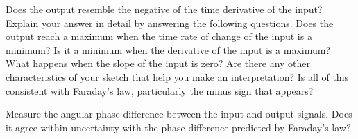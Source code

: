 Does the output resemble the negative of the time derivative of the input? 
Explain your answer in detail by answering the following questions.  Does the 
output reach a maximum when the time rate of change of the input is a minimum? 
Is it a minimum when the derivative of the input is a maximum?  What happens 
when the slope of the input is zero? Are there any other characteristics of 
your sketch that help you make an interpretation? Is all of this consistent 
with Faraday's law, particularly the minus sign that appears?

Measure the angular phase difference between the input and output signals.  
Does it agree within uncertainty with the phase difference predicted by 
Faraday's law?  

\renewcommand{\thesection}{\thechapter.\arabic{section}}
